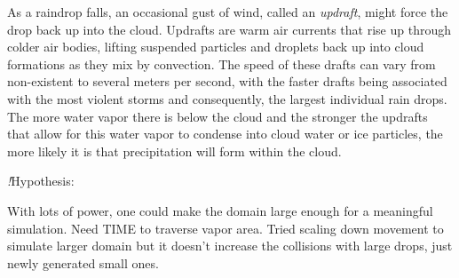 \documentclass[twocolumn,a4paper,10pt]{article}
\newcommand{\TODO}{{\huge\emph{\color{red}!}}}
\begin{document}
As a raindrop falls, an occasional gust of wind, called an \emph{updraft}, might
force the drop back up into the cloud. Updrafts are warm air currents that rise
up through colder air bodies, lifting suspended particles and droplets back up
into cloud formations as they mix by convection. The speed of these drafts can
vary from non-existent to several meters per second, with the faster drafts
being associated with the most violent storms and consequently, the largest
individual rain drops. The more water vapor there is below the cloud and the
stronger the updrafts that allow for this water vapor to condense into cloud
water or ice particles, the more likely it is that precipitation will form
within the cloud.

\TODO Hypothesis:

With lots of power, one could make the domain large enough for a meaningful
simulation. Need TIME to traverse vapor area. Tried scaling down movement to
simulate larger domain but it doesn't increase the collisions with large
drops, just newly generated small ones.
\end{document}

